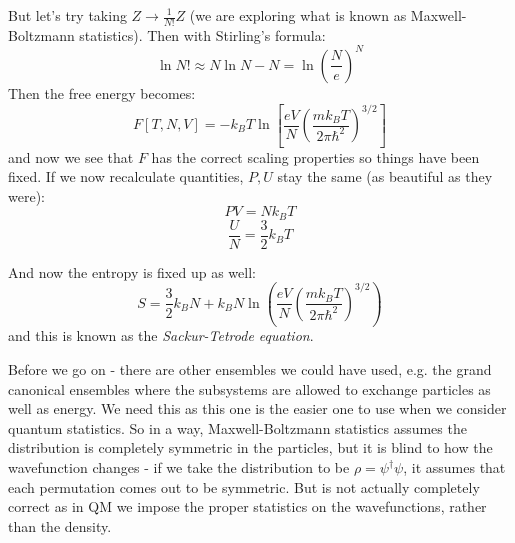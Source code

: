 But let's try taking $Z \to \frac{1}{N!}Z$ (we are exploring what is known as Maxwell-Boltzmann statistics). Then with Stirling's formula:
\begin{equation}
    \ln N! \approx N\ln N - N = \ln \left(\frac{N}{e}\right)^N
\end{equation}
Then the free energy becomes:
\begin{equation}
    F[T, N, V] = -k_B T\ln\left[\frac{eV}{N}\left(\frac{mk_B T}{2\pi \hbar^2}\right)^{3/2}\right]
\end{equation}
and now we see that $F$ has the correct scaling properties so things have been fixed. If we now recalculate quantities, $P, U$ stay the same (as beautiful as they were):
\begin{equation}
    PV = Nk_B T
\end{equation}
\begin{equation}
    \frac{U}{N} = \frac{3}{2}k_B T
\end{equation}

And now the entropy is fixed up as well:
\begin{equation}
    S = \frac{3}{2}k_B N + k_B N\ln\left(\frac{eV}{N}\left(\frac{mk_B T}{2\pi\hbar^2}\right)^{3/2}\right)
\end{equation}
and this is known as the \emph{Sackur-Tetrode equation}.

Before we go on - there are other ensembles we could have used, e.g. the grand canonical ensembles where the subsystems are allowed to exchange particles as well as energy. We need this as this one is the easier one to use when we consider quantum statistics. So in a way, Maxwell-Boltzmann statistics assumes the distribution is completely symmetric in the particles, but it is blind to how the wavefunction changes - if we take the distribution to be $\rho = \psi^\dag \psi$, it assumes that each permutation comes out to be symmetric. But is not actually completely correct as in QM we impose the proper statistics on the wavefunctions, rather than the density.

